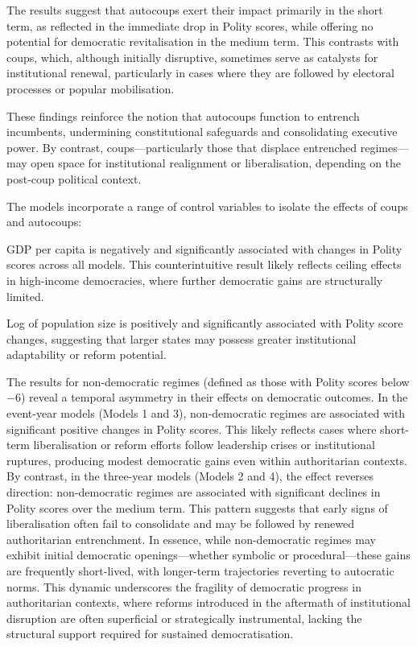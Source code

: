 \documentclass[
  12pt,
]{report}
\begin{document}
The results suggest that autocoups exert their impact primarily in the
short term, as reflected in the immediate drop in Polity scores, while
offering no potential for democratic revitalisation in the medium term.
This contrasts with coups, which, although initially disruptive,
sometimes serve as catalysts for institutional renewal, particularly in
cases where they are followed by electoral processes or popular
mobilisation.

These findings reinforce the notion that autocoups function to entrench
incumbents, undermining constitutional safeguards and consolidating
executive power. By contrast, coups---particularly those that displace
entrenched regimes---may open space for institutional realignment or
liberalisation, depending on the post-coup political context.

The models incorporate a range of control variables to isolate the
effects of coups and autocoups:

GDP per capita is negatively and significantly associated with changes
in Polity scores across all models. This counterintuitive result likely
reflects ceiling effects in high-income democracies, where further
democratic gains are structurally limited.

Log of population size is positively and significantly associated with
Polity score changes, suggesting that larger states may possess greater
institutional adaptability or reform potential.

The results for non-democratic regimes (defined as those with Polity
scores below −6) reveal a temporal asymmetry in their effects on
democratic outcomes. In the event-year models (Models 1 and 3),
non-democratic regimes are associated with significant positive changes
in Polity scores. This likely reflects cases where short-term
liberalisation or reform efforts follow leadership crises or
institutional ruptures, producing modest democratic gains even within
authoritarian contexts. By contrast, in the three-year models (Models 2
and 4), the effect reverses direction: non-democratic regimes are
associated with significant declines in Polity scores over the medium
term. This pattern suggests that early signs of liberalisation often
fail to consolidate and may be followed by renewed authoritarian
entrenchment. In essence, while non-democratic regimes may exhibit
initial democratic openings---whether symbolic or procedural---these
gains are frequently short-lived, with longer-term trajectories
reverting to autocratic norms. This dynamic underscores the fragility of
democratic progress in authoritarian contexts, where reforms introduced
in the aftermath of institutional disruption are often superficial or
strategically instrumental, lacking the structural support required for
sustained democratisation.
\end{document}
